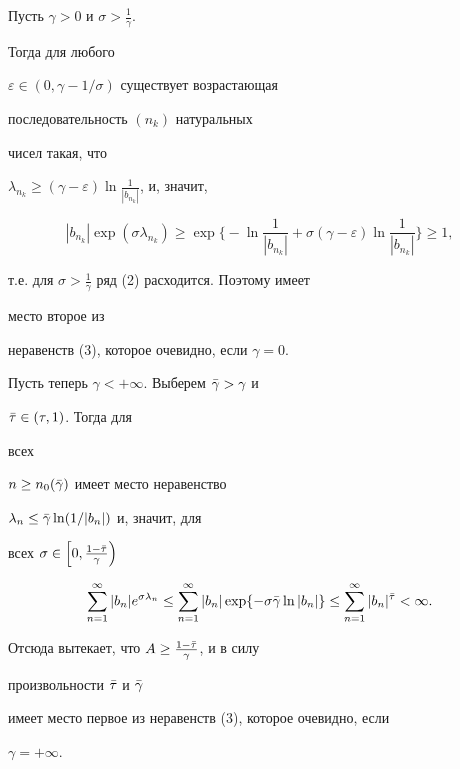 \begin{pf} Пусть $\gamma>0$ и $\sigma>\frac{1}{\gamma}$. 


Тогда для любого 


$\varepsilon\in(0,\gamma-1/\sigma)$ существует возрастающая 


последовательность $(n_k)$ натуральных 


чисел такая, что 


$\lambda_{n_k}\ge(\gamma-\varepsilon)\ln\frac{1}{|b_{n_k}|}$, и, значит, 


$$ 


|b_{n_k}|\exp(\sigma\lambda_{n_k})\ge\exp 


\biggl\{-\ln\frac{1}{|b_{n_k}|}+\sigma(\gamma-\varepsilon) 


\ln\frac{1}{|b_{n_k}|}\biggr\}\ge 1, 


$$ 


т.е. для $\sigma>\frac{1}{\gamma}$ ряд (2) расходится. Поэтому имеет 


место второе из 


неравенств (3), которое очевидно, если $\gamma=0$. 


 


Пусть теперь $\gamma<+\infty$. Выберем $\Bar\gamma>\gamma$ и 


$\Bar\tau\in(\tau,1)$. Тогда для 


всех 


$n\ge n_0(\Bar\gamma)$ имеет место неравенство 


$\lambda_n\le\Bar\gamma\ln(1/|b_n|)$ и, значит, для 


всех $\sigma\in\Bigl[0,\frac{1-\Bar\tau}{\gamma}\Bigr)$ 


$$ 


\sum^\infty_{n=1}|b_n|e^{\sigma\lambda_n}\le 


\sum^\infty_{n=1}|b_n|\exp\{-\sigma\Bar\gamma\ln|b_n|\} 


\le\sum^\infty_{n=1}|b_n|^{\Bar\tau}<\infty. 


$$ 


 


Отсюда вытекает, что $A\ge\frac{1-\Bar\tau}{\gamma}$, и в силу 


произвольности $\Bar\tau$ и $\Bar\gamma$ 


имеет место первое из неравенств (3), которое очевидно, если 


$\gamma=+\infty$. 


\end{pf} 


